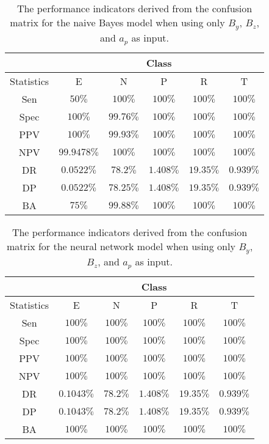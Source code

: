 \begin{table}[!ht]
	\centering
	\begin{tabular}{|c|c|c|c|c|c|}
		\hline
		 & \multicolumn{5}{c|}{Class} \\ \hline
		Statistics & E & N & P & R & T \\ \hline
		Sen & $50\%$ & $100\%$ & $100\%$ & $100\%$ & $100\%$ \\ \hline
		Spec & $100\%$ & $99.76\%$ & $100\%$ & $100\%$ & $100\%$ \\ \hline
		PPV & $100\%$ & $99.93\%$ & $100\%$ & $100\%$ & $100\%$ \\ \hline
		NPV & $99.9478\%$ & $100\%$ & $100\%$ & $100\%$ & $100\%$ \\ \hline
		DR & $0.0522\%$ & $78.2\%$ & $1.408\%$ & $19.35\%$ & $0.939\%$ \\ \hline
		DP & $0.0522\%$ & $78.25\%$ & $1.408\%$ & $19.35\%$ & $0.939\%$ \\ \hline
		BA & $75\%$ & $99.88\%$ & $100\%$ & $100\%$ & $100\%$ \\ \hline
	\end{tabular}
	\caption{The performance indicators derived from the confusion matrix for the naive Bayes model when using only $B_{y}$, $B_{z}$, and $a_{p}$ as input.}
	\label{tab:cs:reverse:yzap:nb}
\end{table}

\begin{table}[!ht]
	\centering
	\begin{tabular}{|c|c|c|c|c|c|}
		\hline
		 & \multicolumn{5}{c|}{Class} \\ \hline
		Statistics & E & N & P & R & T \\ \hline
		Sen & $100\%$ & $100\%$ & $100\%$ & $100\%$ & $100\%$ \\ \hline
		Spec & $100\%$ & $100\%$ & $100\%$ & $100\%$ & $100\%$ \\ \hline
		PPV & $100\%$ & $100\%$ & $100\%$ & $100\%$ & $100\%$ \\ \hline
		NPV & $100\%$ & $100\%$ & $100\%$ & $100\%$ & $100\%$ \\ \hline
		DR & $0.1043\%$ & $78.2\%$ & $1.408\%$ & $19.35\%$ & $0.939\%$ \\ \hline
		DP & $0.1043\%$ & $78.2\%$ & $1.408\%$ & $19.35\%$ & $0.939\%$ \\ \hline
		BA & $100\%$ & $100\%$ & $100\%$ & $100\%$ & $100\%$ \\ \hline
	\end{tabular}
	\caption{The performance indicators derived from the confusion matrix for the neural network model when using only $B_{y}$, $B_{z}$, and $a_{p}$ as input.}
	\label{tab:cs:reverse:yzap:nnet}
\end{table}

